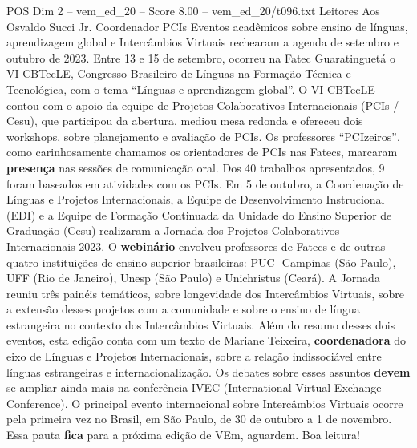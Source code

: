 \begin{textsample}{POS Dim 2 – vem\_ed\_20 – Score 8.00 – vem\_ed\_20/t096.txt}  \label{ex:f2_pos_098}
Leitores Aos Osvaldo Succi Jr.
Coordenador PCIs Eventos acadêmicos sobre ensino de línguas, aprendizagem global e Intercâmbios Virtuais rechearam a agenda de setembro e outubro de 2023.
Entre 13 e 15 de setembro, ocorreu na Fatec Guaratinguetá o VI CBTecLE, Congresso Brasileiro de Línguas na Formação Técnica e Tecnológica, com o tema “Línguas e aprendizagem global”.
O VI CBTecLE contou com o apoio da equipe de Projetos Colaborativos Internacionais (PCIs / Cesu), que participou da abertura, mediou mesa redonda e ofereceu dois workshops, sobre planejamento e avaliação de PCIs.
Os professores “PCIzeiros”, como carinhosamente chamamos os orientadores de PCIs nas Fatecs, marcaram \textbf{presença} nas sessões de comunicação oral.
Dos 40 trabalhos apresentados, 9 foram baseados em atividades com os PCIs.
Em 5 de outubro, a Coordenação de Línguas e Projetos Internacionais, a Equipe de Desenvolvimento Instrucional (EDI) e a Equipe de Formação Continuada da Unidade do Ensino Superior de Graduação (Cesu) realizaram a Jornada dos Projetos Colaborativos Internacionais 2023.
O \textbf{webinário} envolveu professores de Fatecs e de outras quatro instituições de ensino superior brasileiras: PUC- Campinas (São Paulo), UFF (Rio de Janeiro), Unesp (São Paulo) e Unichristus (Ceará).
A Jornada reuniu três painéis temáticos, sobre longevidade dos Intercâmbios Virtuais, sobre a extensão desses projetos com a comunidade e sobre o ensino de língua estrangeira no contexto dos Intercâmbios Virtuais.
Além do resumo desses dois eventos, esta edição conta com um texto de Mariane Teixeira, \textbf{coordenadora} do eixo de Línguas e Projetos Internacionais, sobre a relação indissociável entre línguas estrangeiras e internacionalização.
Os debates sobre esses assuntos \textbf{devem} se ampliar ainda mais na conferência IVEC (International Virtual Exchange Conference).
O principal evento internacional sobre Intercâmbios Virtuais ocorre pela primeira vez no Brasil, em São Paulo, de 30 de outubro a 1 de novembro.
Essa pauta \textbf{fica} para a próxima edição de VEm, aguardem.
Boa leitura!

\end{textsample}
